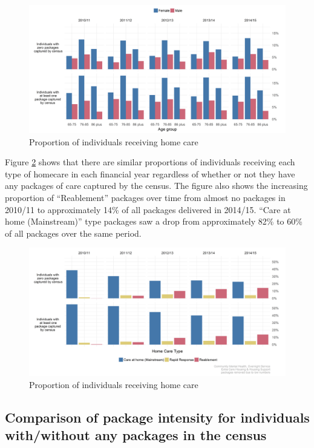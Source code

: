 \documentclass[]{article}
\begin{document}
\begin{figure}[]
  \centering
    \includegraphics{figures/chapter-renf/12a-prop-plot-age.png}
    \caption{Proportion of individuals receiving home care}
    \label{fig:renf-prop-plot-age}
\end{figure}

Figure \ref{fig:renf-prop-plot} shows that there are similar proportions
of individuals receiving each type of homecare in each financial year
regardless of whether or not they have any packages of care captured by
the census. The figure also shows the increasing proportion of
``Reablement'' packages over time from almost no packages in 2010/11 to
approximately 14\% of all packages delivered in 2014/15. ``Care at home
(Mainstream)'' type packages saw a drop from approximately 82\% to 60\%
of all packages over the same period.

\begin{figure}[]
  \centering
    \includegraphics{figures/chapter-renf/12c-census-prop-plot.png}
    \caption{Proportion of individuals receiving home care}
    \label{fig:renf-prop-plot}
\end{figure}

\FloatBarrier

\subsection{Comparison of package intensity for individuals with/without any packages in the census}\label{subsec:renf-inten-diff}
\end{document}
